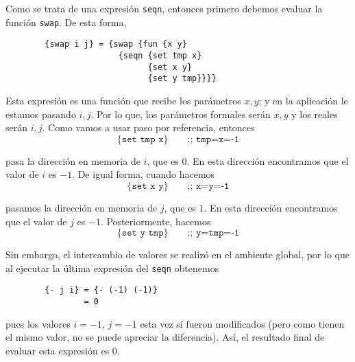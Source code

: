 \documentclass[letterpaper,11pt]{article}
\begin{document}
\begin{enumerate}
\begin{itemize}
        Como se trata de una expresión \texttt{seqn}, entonces primero 
        debemos evaluar la función \texttt{swap}. De esta forma, 
        \begin{verbatim}
        {swap i j} = {swap {fun {x y}
                       {seqn {set tmp x}
                             {set x y}
                             {set y tmp}}}}
        \end{verbatim}

        Esta expresión es una función que recibe los parámetros $x,y$; y en la 
        aplicación le estamos pasando $i,j$. Por lo que, los parámetros formales 
        serán $x,y$ y los reales serán $i,j$. Como vamos a usar paso por 
        referencia, entonces 
        \begin{equation*}
            \texttt{\{set tmp x\}} \quad \quad \texttt{;; tmp=x=-1}
        \end{equation*}

        pasa la dirección en memoria de $i$, que es $0$. En esta dirección 
        encontramos que el valor de $i$ es $-1$. De igual forma, cuando hacemos 
        \begin{equation*}
            \texttt{\{set x y\}} \quad \quad \texttt{;; x=y=-1}
        \end{equation*}

        pasamos la dirección en memoria de $j$, que es $1$. En esta dirección 
        encontramos que el valor de $j$ es $-1$. Posteriormente, hacemos 
        \begin{equation*}
            \texttt{\{set y tmp\}} \quad \quad \texttt{;; y=tmp=-1}
        \end{equation*}

        Sin embargo, el intercambio de valores se realizó en el ambiente global, 
        por lo que al ejecutar la última expresión del \texttt{seqn} obtenemos 
        \begin{verbatim}
        {- j i} = {- (-1) (-1)}
                = 0
        \end{verbatim}

        pues los valores $i=-1$, $j=-1$ esta vez sí fueron modificados (pero 
        como tienen el mismo valor, no se puede apreciar la diferencia). Así, el 
        resultado final de evaluar esta expresión es $0$.


\end{itemize}
\end{enumerate}
\end{document}
